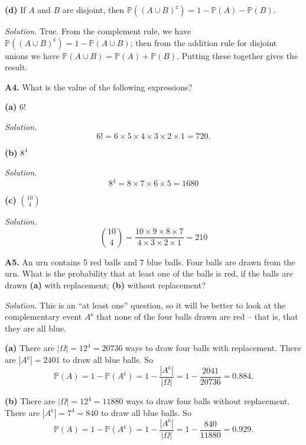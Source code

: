 \documentclass[
  a4paper,
]{book}
\theoremstyle{definition}
\theoremstyle{definition}
\theoremstyle{definition}
\theoremstyle{definition}
\theoremstyle{remark}
\begin{document}
\textbf{(d)} If \(A\) and \(B\) are disjoint, then \(\mathbb P((A \cup B)^{\mathsf{c}}) = 1 - \mathbb P(A) - \mathbb P(B)\).

\begin{myanswers}
\emph{Solution.} True. From the complement rule, we have \(\mathbb P((A \cup B)^{\mathsf{c}}) = 1 - \mathbb P(A \cup B)\); then from the addition rule for disjoint unions we have \(\mathbb P(A \cup B) = \mathbb P(A) + \mathbb P(B)\). Putting these together gives the result.

\end{myanswers}

\textbf{A4.} What is the value of the following expressions?

\textbf{(a)} \(6!\)

\begin{myanswers}
\emph{Solution.}
\[ 6! = 6 \times 5 \times 4 \times 3 \times 2 \times 1 = 720. \]

\end{myanswers}

\textbf{(b)} \({8}^{\underline{4}}\)

\begin{myanswers}
\emph{Solution.}
\[ {8}^{\underline{4}} = 8 \times 7 \times 6 \times 5 = 1680 \]

\end{myanswers}

\textbf{(c)} \({\displaystyle \binom{10}{4}}\)

\begin{myanswers}
\emph{Solution.}
\[ \binom{10}{4} = \frac{10 \times 9 \times 8 \times 7}{4\times 3\times 2\times 1} = 210 \]

\end{myanswers}

\textbf{A5.} An urn contains 5 red balls and 7 blue balls. Four balls are drawn from the urn. What is the probability that at least one of the balls is red, if the balls are drawn \textbf{(a)} with replacement; \textbf{(b)} without replacement?

\begin{myanswers}
\emph{Solution.} This is an ``at least one'' question, so it will be better to look at the complementary event \(A^\mathsf{c}\) that none of the four balls drawn are red -- that is, that they are all blue.

\textbf{(a)} There are \(|\Omega| = 12^4 = 20736\) ways to draw four balls with replacement. There are \(|A^\mathsf{c}| = 2401\) to draw all blue balls. So
\[ \mathbb P(A) = 1 - \mathbb P(A^\mathsf{c}) = 1 - \frac{|A^\mathsf{c}|}{|\Omega|} = 1 - \frac{2041}{20736} = 0.884 . \]

\textbf{(b)} There are \(|\Omega| = {12}^{\underline{4}} = 11880\) ways to draw four balls without replacement. There are \(|A^\mathsf{c}| = {7}^{\underline{4}} = 840\) to draw all blue balls. So
\[ \mathbb P(A) = 1 - \mathbb P(A^\mathsf{c}) = 1 - \frac{|A^\mathsf{c}|}{|\Omega|} = 1 - \frac{840}{11880} = 0.929 . \]

\end{myanswers}
\end{document}
